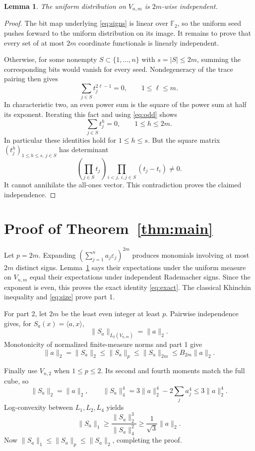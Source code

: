 \documentclass[11pt]{article}
\newtheorem{lemma}[theorem]{Lemma}
\newcommand{\F}{\mathbb F}
\begin{document}
\begin{lemma}\label{lem:ind}
The uniform distribution on $V_{n,m}$ is $2m$-wise independent.
\end{lemma}

\begin{proof}
The bit map underlying \eqref{eq:signs} is linear over $\F_2$, so the
uniform seed pushes forward to the uniform distribution on its image.
It remains to prove that every set of at most $2m$ coordinate
functionals is linearly independent.

Otherwise, for some nonempty $S\subset\{1,\ldots,n\}$ with
$s=|S|\le2m$, summing the corresponding bits would vanish for every
seed.  Nondegeneracy of the trace pairing then gives
\begin{equation}\label{eq:odd}
 \sum_{j\in S}t_j^{2\ell-1}=0,
 \qquad 1\le\ell\le m.
\end{equation}
In characteristic two, an even power sum is the square of the power sum
at half its exponent.  Iterating this fact and using \eqref{eq:odd}
shows
\[
 \sum_{j\in S}t_j^h=0,\qquad 1\le h\le2m.
\]
In particular these identities hold for $1\le h\le s$.  But the square
matrix $(t_j^h)_{1\le h\le s,\,j\in S}$ has determinant
\[
 \left(\prod_{j\in S}t_j\right)
 \prod_{i<j,\ i,j\in S}(t_j-t_i)\ne0.
\]
It cannot annihilate the all-ones vector.  This contradiction proves the
claimed independence.
\end{proof}

\section{Proof of Theorem~\ref{thm:main}}

Let $p=2m$.  Expanding
$(\sum_{j=1}^n a_j\varepsilon_j)^{2m}$ produces monomials involving at
most $2m$ distinct signs.  Lemma~\ref{lem:ind} says their expectations
under the uniform measure on $V_{n,m}$ equal their expectations under
independent Rademacher signs.  Since the exponent is even, this proves
the exact identity \eqref{eq:exact}.  The classical Khinchin inequality
and \eqref{eq:size} prove part 1.

For part 2, let $2m$ be the least even integer at least $p$.  Pairwise
independence gives, for
$S_a(x)=\langle a,x\rangle$,
\[
 \|S_a\|_{L_2(V_{n,m})}=\|a\|_2.
\]
Monotonicity of normalized finite-measure norms and part 1 give
\[
 \|a\|_2=\|S_a\|_2\le\|S_a\|_p
 \le\|S_a\|_{2m}\le B_{2m}\|a\|_2.
\]

Finally use $V_{n,2}$ when $1\le p\le2$.  Its second and fourth moments
match the full cube, so
\[
 \|S_a\|_2=\|a\|_2,
 \qquad
 \|S_a\|_4^4
 =3\|a\|_2^4-2\sum_j a_j^4
 \le3\|a\|_2^4.
\]
Log-convexity between $L_1,L_2,L_4$ yields
\[
 \|S_a\|_1\ge\frac{\|S_a\|_2^3}{\|S_a\|_4^2}
 \ge\frac1{\sqrt3}\|a\|_2.
\]
Now $\|S_a\|_1\le\|S_a\|_p\le\|S_a\|_2$, completing the proof.
\end{document}
